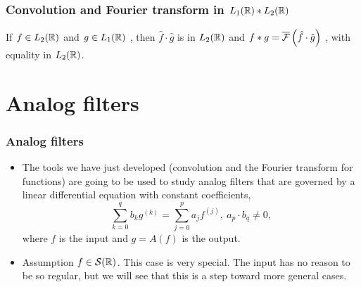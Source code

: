 

\begin{frame}
\frametitle{Convolution and Fourier transform in $L_1(\mathbb{R}) * L_2(\mathbb{R})$}
\begin{theorem}
If $ f\in L_2(\mathbb{R})$ and $g\in L_1(\mathbb{R})$ , then $\hat{f}\cdot\hat{g}$  is in $L_2(\mathbb{R})$  and $f*g=\overline{\mathcal{F}}\left( \hat{f}\cdot\hat{g} \right)$ , with  equality in $L_2(\mathbb{R})$.
\end{theorem}
\end{frame}

\section{Analog filters}
\begin{frame}
\frametitle{Analog filters}
\begin{itemize}
\item The tools we have just developed (convolution and the Fourier transform for functions) are going to be used to study analog filters that are governed by a linear differential equation with constant coefficients,
$$
\sum_{k=0}^{q}b_{k}g^{(k)}=\sum_{j=0}^{p}a_{j}f^{(j)},\ a_{p}\cdot b_{q}\neq 0,
$$
where $f$ is the input and $g=A(f)$ is the output.
\item  \alert{Assumption}  $f \in \mathcal{S}(\mathbb{R})$. This case is very special. The input has no reason to be so regular, but we will see that this is a step toward more general cases.
\end{itemize}
\end{frame}

